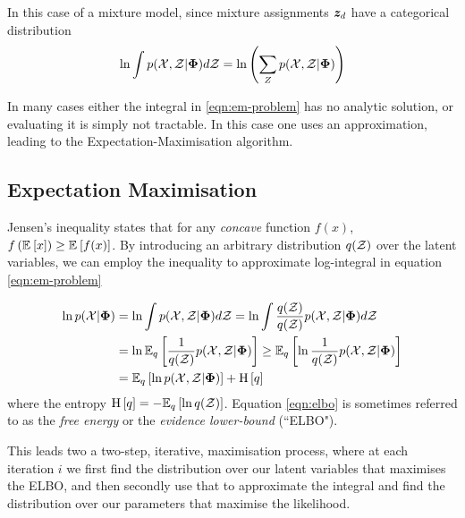 In this case of a mixture model, since mixture assignments $\vv{z}_d$ have a categorical distribution
\begin{align}
\ln \int \joint d\zdat = \ln \left(\sum_Z \joint\right)
\end{align}

In many cases either the integral in \eqref{eqn:em-problem} has no analytic solution, or evaluating it is simply not tractable. In this case one uses an approximation, leading to the Expectation-Maximisation algorithm.
\subsection{Expectation Maximisation}
Jensen's inequality states that for any \emph{concave} function $f(x)$, $f\left(\ex{x}{}\right) \geq \ex{f(x)}{}$. By introducing an arbitrary distribution $q(\zdat)$ over the latent variables, we can employ the inequality to approximate log-integral in equation \eqref{eqn:em-problem}

\begin{align}
 \ln p(\xdat|\params) & = \ln \int \joint d\zdat =  \ln \int \frac{q(\zdat)}{q(\zdat)} \joint d\zdat\\ 
     &=  \ln \ex{\oneover{q(\zdat)}\joint}{q} \geq  \ex{\ln \oneover{q(\zdat)}\joint}{q}\\
     &= \ex{\ln \joint}{q} + \ent{q} \label{eqn:elbo}
\end{align}
where the entropy $\ent{q} = -\ex{\ln q(\zdat)}{q}$. Equation \eqref{eqn:elbo} is sometimes referred to as the \emph{free energy} or the \emph{evidence lower-bound} (``ELBO").

This leads two a two-step, iterative, maximisation process, where at each iteration $i$ we first find the distribution over our latent variables that maximises the ELBO, and then secondly use that to approximate the integral and find the distribution over our parameters that maximise the likelihood.


